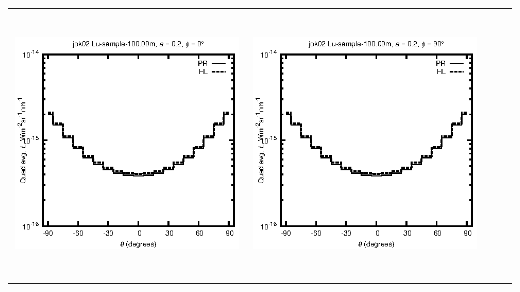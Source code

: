 \documentclass[10pt,a4paper]{article}
\begin{document}
\begin{adjustwidth}{-1.2in}{-1.2in}
\begin{tabular}{c c c c}
\includegraphics[height=7cm]{../eps/jok02_Lu_sample_100.00m_fwd.eps} &
\includegraphics[height=7cm]{../eps/jok02_Lu_sample_100.00m_cross.eps} \\
\end{tabular}

\pagebreak


\end{adjustwidth}
\end{document}
